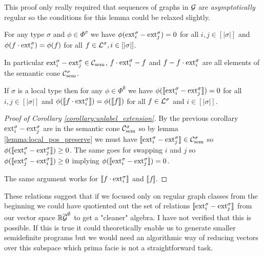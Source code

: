 \begin{note}
    This proof only really required that sequences of graphs in $\mathcal{G}$ are
    \textit{asymptotically} regular so the conditions for this lemma could be relaxed
    slightly.
\end{note}

\begin{corollary}
    For any type $\sigma$ and $\phi\in\Phi^\sigma$ we
    have $\phi(\mathrm{ext}_i^\sigma - \mathrm{ext}_j^\sigma) = 0$ for all $i,j \in [|\sigma|]$
    and $\phi(f \cdot \mathrm{ext}_i^\sigma) = \phi(f)$ for all
    $f \in \mathcal{L}^\sigma, i \in [|\sigma|]$.

    In particular $\mathrm{ext}_i^\sigma - \mathrm{ext}_j^\sigma\in\mathcal{C}_\mathrm{sem}$,
    $f\cdot \mathrm{ext}_i^\sigma - f$ and $f - f\cdot\mathrm{ext}_i^\sigma$ are all
    elements of the semantic cone $\mathcal{C}_\mathrm{sem}^\sigma$.
\end{corollary}

\begin{corollary}
    \label{corollary:unlabel_extension}
    If $\sigma$ is a local type then for any $\phi\in\Phi^\emptyset$ we have
    $\phi(\llbracket \mathrm{ext}_i^\sigma - \mathrm{ext}_j^\sigma\rrbracket) = 0$
    for all $i,j\in [|\sigma|]$ and
    $\phi(\llbracket f \cdot \mathrm{ext}_i^\sigma\rrbracket) = \phi(\llbracket f \rrbracket)$
    for all $f\in\mathcal{L}^\sigma$ and $i\in [|\sigma|]$.
\end{corollary}

\begin{proof}[Proof of Corollary \ref{corollary:unlabel_extension}]
    By the previous corollary $\mathrm{ext}_i^\sigma - \mathrm{ext}_j^\sigma$ are in the
    semantic cone $\mathcal{C}_\mathrm{sem}^\sigma$ so by lemma \ref{lemma:local_pos_preserve}
    we must have $\llbracket \mathrm{ext}_i^\sigma - \mathrm{ext}_j^\sigma \rrbracket \in \mathcal{C}_\mathrm{sem}^\sigma$
    so $\phi(\llbracket \mathrm{ext}_i^\sigma - \mathrm{ext}_j^\sigma\rrbracket) \geq 0$.
    The same goes for swapping $i$ and $j$ so
    $\phi(\llbracket \mathrm{ext}_j^\sigma - \mathrm{ext}_i^\sigma\rrbracket) \geq 0$
    implying $\phi(\llbracket \mathrm{ext}_i^\sigma - \mathrm{ext}_j^\sigma\rrbracket) = 0$.

    The same argument works for $\llbracket f\cdot\mathrm{ext}_i^\sigma \rrbracket$ and
    $\llbracket f\rrbracket$.
\end{proof}

\begin{note}
    These relations suggest that if we focused only on regular graph classes
    from the beginning we could have quotiented out the set of relations
    $\llbracket \mathrm{ext}_i^\sigma - \mathrm{ext}_j^\sigma\rrbracket$ from our vector space $\mathbb{R}\overline{\mathcal{G}}^\emptyset$
    to get a "cleaner" algebra. I have not verified that this is possible. If this is true
    it could theoretically enable us to generate smaller semidefinite programs but we would
    need an algorithmic way of reducing vectors over this subspace which prima facie is not
    a straightforward task.
\end{note}

